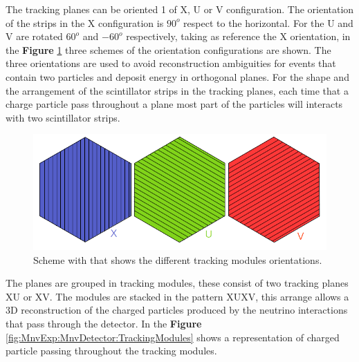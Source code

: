 The tracking planes can be oriented 1 of X, U or V configuration. The orientation of the strips in the X configuration is $90^o$ respect to the horizontal. For the U and V are rotated $60^o$ and $-60^o$ respectively, taking as reference the X orientation, in the \textbf{Figure} \ref{fig:MnvExp:MnvDetector:PlanesOrientations} three schemes of the orientation configurations are shown. The three orientations are used to avoid reconstruction ambiguities for events that contain two particles and deposit energy in orthogonal planes. For the shape and the arrangement of the scintillator strips in the tracking planes, each time that a charge particle pass throughout a plane most part of the particles will interacts with two scintillator strips. 

\begin{figure}[!htb]
\centering
\includegraphics[scale=0.4]{Figures/Chapter2/PlanesOrientation.png}

        \caption{Scheme with that shows the different tracking modules orientations.} 
\label{fig:MnvExp:MnvDetector:PlanesOrientations}
\end{figure}

The planes are grouped in tracking modules, these consist of two tracking planes XU or XV. The modules are stacked in the pattern XUXV, this arrange allows a 3D reconstruction of the charged particles produced by the neutrino interactions that pass through the detector. In the \textbf{Figure} \ref{fig:MnvExp:MnvDetector:TrackingModules} shows a representation of charged particle passing throughout the tracking modules. 

